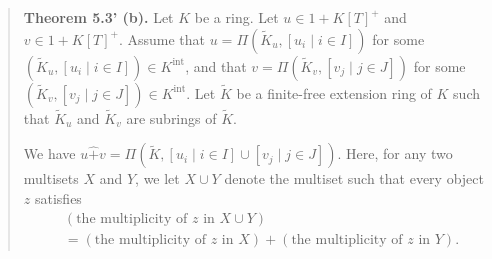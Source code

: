 \documentclass[numbers=enddot,12pt,final,onecolumn,notitlepage]{scrartcl}%
\begin{document}
\begin{quote}
\textbf{Theorem 5.3' (b).} Let $K$ be a ring. Let $u\in1+K\left[  T\right]
^{+}$ and $v\in1+K\left[  T\right]  ^{+}$. Assume that $u=\Pi\left(
\widetilde{K}_{u},\left[  u_{i}\mid i\in I\right]  \right)  $ for some
$\left(  \widetilde{K}_{u},\left[  u_{i}\mid i\in I\right]  \right)  \in
K^{\operatorname*{int}}$, and that $v=\Pi\left(  \widetilde{K}_{v},\left[
v_{j}\mid j\in J\right]  \right)  $ for some $\left(  \widetilde{K}%
_{v},\left[  v_{j}\mid j\in J\right]  \right)  \in K^{\operatorname*{int}}$.
Let $\widetilde{K}$ be a finite-free extension ring of $K$ such that
$\widetilde{K}_{u}$ and $\widetilde{K}_{v}$ are subrings of $\widetilde{K}$.

We have $u\widehat{+}v=\Pi\left(  \widetilde{K},\left[  u_{i}\mid i\in
I\right]  \cup\left[  v_{j}\mid j\in J\right]  \right)  $. Here, for any two
multisets $X$ and $Y$, we let $X\cup Y$ denote the multiset such that every
object $z$ satisfies%
\begin{align*}
&  \left(  \text{the multiplicity of }z\text{ in }X\cup Y\right) \\
&  =\left(  \text{the multiplicity of }z\text{ in }X\right)  +\left(
\text{the multiplicity of }z\text{ in }Y\right)  .
\end{align*}



\end{quote}
\end{document}
